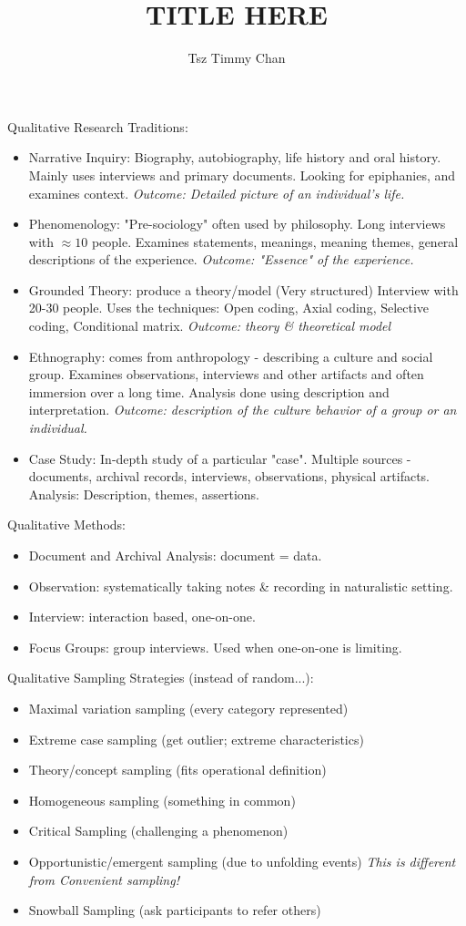 \documentclass{TC}
\title{TITLE HERE}	%
\author{Tsz Timmy Chan}	%
\begin{document}
Qualitative Research Traditions:
\begin{itemize}
\item Narrative Inquiry: Biography, autobiography, life history and oral history. Mainly uses interviews and primary documents. Looking for epiphanies, and examines context. \emph{Outcome: Detailed picture of an individual's life.} 
\item Phenomenology: "Pre-sociology" often used by philosophy. Long interviews with $\approx 10$ people. Examines statements, meanings, meaning themes, general descriptions of the experience. \emph{Outcome: "Essence" of the experience.}
\item Grounded Theory: produce a theory/model (Very structured) Interview with 20-30 people. Uses the techniques: Open coding, Axial coding, Selective coding, Conditional matrix. \textit{Outcome: theory \& theoretical model}
\item Ethnography: comes from anthropology - describing a culture and social group. Examines observations, interviews and other artifacts and often immersion over a long time. Analysis done using description and interpretation. \emph{Outcome: description of the culture behavior of a group or an individual.}
\item Case Study: In-depth study of a particular "case". Multiple sources - documents, archival records, interviews, observations, physical artifacts. Analysis: Description, themes, assertions.
\end{itemize}

Qualitative Methods:
\begin{itemize}
\item Document and Archival Analysis: document = data.
\item Observation: systematically taking notes \& recording in naturalistic setting.  
\item Interview: interaction based, one-on-one.
\item Focus Groups: group interviews. Used when one-on-one is limiting. 
\end{itemize}


Qualitative Sampling Strategies (instead of random...):
\begin{itemize}

\item Maximal variation sampling (every category represented)
\item Extreme case sampling (get outlier; extreme characteristics) 
\item Theory/concept sampling (fits operational definition)
\item Homogeneous sampling (something in common)
\item Critical Sampling (challenging a phenomenon)
\item Opportunistic/emergent sampling (due to unfolding events) \textit{This is different from Convenient sampling!}
\item Snowball Sampling (ask participants to refer others)
\end{itemize}
\end{document}
